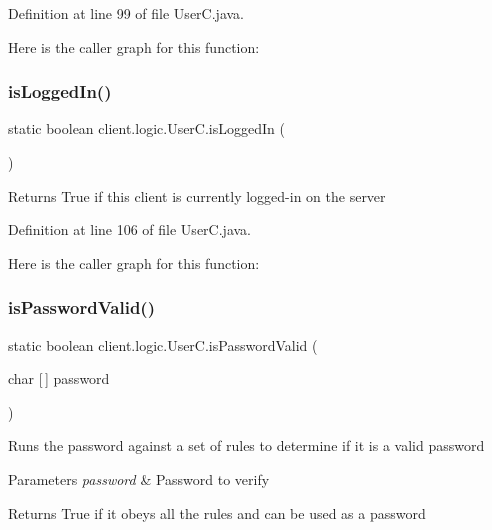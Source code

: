 Definition at line 99 of file User\+C.\+java.

Here is the caller graph for this function\+:
\hypertarget{classclient_1_1logic_1_1_user_c_ad4fb84e487e917c202a4e1bcdea62dd5}{}\label{classclient_1_1logic_1_1_user_c_ad4fb84e487e917c202a4e1bcdea62dd5} 
\subsubsection{\texorpdfstring{is\+Logged\+In()}{isLoggedIn()}}
{\footnotesize\ttfamily static boolean client.\+logic.\+User\+C.\+is\+Logged\+In (\begin{DoxyParamCaption}{ }\end{DoxyParamCaption})\hspace{0.3cm}{\ttfamily [static]}}

\begin{DoxyReturn}{Returns}
True if this client is currently logged-\/in on the server 
\end{DoxyReturn}


Definition at line 106 of file User\+C.\+java.

Here is the caller graph for this function\+:
\hypertarget{classclient_1_1logic_1_1_user_c_a724d1799c3963f516238cdf0d85ccf52}{}\label{classclient_1_1logic_1_1_user_c_a724d1799c3963f516238cdf0d85ccf52} 
\subsubsection{\texorpdfstring{is\+Password\+Valid()}{isPasswordValid()}}
{\footnotesize\ttfamily static boolean client.\+logic.\+User\+C.\+is\+Password\+Valid (\begin{DoxyParamCaption}\item[{char \mbox{[}$\,$\mbox{]}}]{password }\end{DoxyParamCaption})\hspace{0.3cm}{\ttfamily [static]}}

Runs the password against a set of rules to determine if it is a valid password


\begin{DoxyParams}{Parameters}
{\em password} & Password to verify \\
\hline
\end{DoxyParams}
\begin{DoxyReturn}{Returns}
True if it obeys all the rules and can be used as a password 
\end{DoxyReturn}


